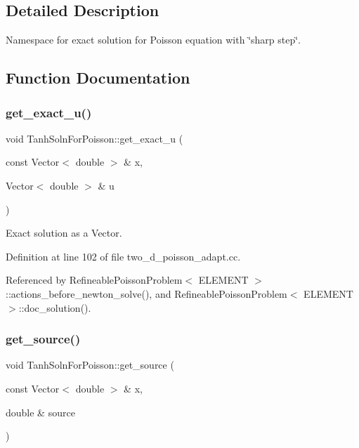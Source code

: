 \subsection{Detailed Description}
Namespace for exact solution for Poisson equation with \char`\"{}sharp step\char`\"{}. 

\subsection{Function Documentation}
\mbox{\label{namespaceTanhSolnForPoisson_af7896e9c18ce6438c73ae2a875e8b7de}} 
\subsubsection{\texorpdfstring{get\+\_\+exact\+\_\+u()}{get\_exact\_u()}}
{\footnotesize\ttfamily void Tanh\+Soln\+For\+Poisson\+::get\+\_\+exact\+\_\+u (\begin{DoxyParamCaption}\item[{const Vector$<$ double $>$ \&}]{x,  }\item[{Vector$<$ double $>$ \&}]{u }\end{DoxyParamCaption})}



Exact solution as a Vector. 



Definition at line 102 of file two\+\_\+d\+\_\+poisson\+\_\+adapt.\+cc.



Referenced by Refineable\+Poisson\+Problem$<$ E\+L\+E\+M\+E\+N\+T $>$\+::actions\+\_\+before\+\_\+newton\+\_\+solve(), and Refineable\+Poisson\+Problem$<$ E\+L\+E\+M\+E\+N\+T $>$\+::doc\+\_\+solution().

\mbox{\label{namespaceTanhSolnForPoisson_ae1b9d6789ff301e3d63a4e292213036c}} 
\subsubsection{\texorpdfstring{get\+\_\+source()}{get\_source()}}
{\footnotesize\ttfamily void Tanh\+Soln\+For\+Poisson\+::get\+\_\+source (\begin{DoxyParamCaption}\item[{const Vector$<$ double $>$ \&}]{x,  }\item[{double \&}]{source }\end{DoxyParamCaption})}



